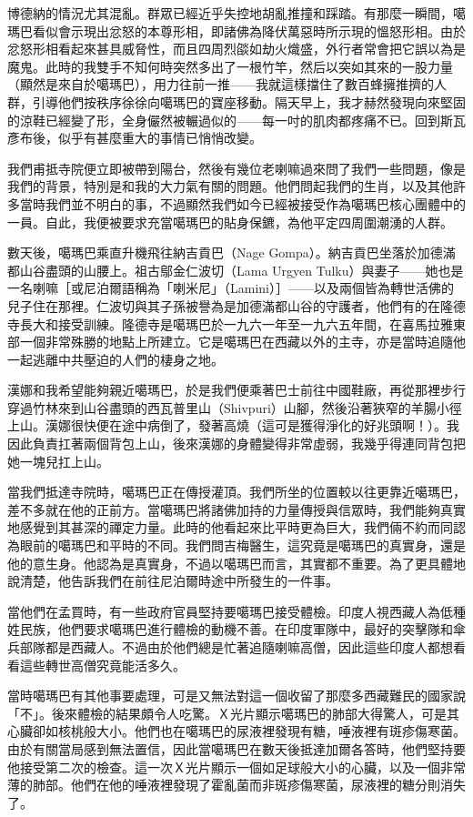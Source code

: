 博德納的情況尤其混亂。群眾已經近乎失控地胡亂推撞和踩踏。有那麼一瞬間，噶瑪巴看似會示現出忿怒的本尊形相，即諸佛為降伏萬惡時所示現的慍怒形相。由於忿怒形相看起來甚具威脅性，而且四周烈燄如劫火熾盛，外行者常會把它誤以為是魔鬼。此時的我雙手不知何時突然多出了一根竹竿，然后以突如其來的一股力量（顯然是來自於噶瑪巴），用力往前一推——我就這樣擋住了數百蜂擁推擠的人群，引導他們按秩序徐徐向噶瑪巴的寶座移動。隔天早上，我才赫然發現向來堅固的涼鞋已經變了形，全身儼然被輾過似的——每一吋的肌肉都疼痛不已。回到斯瓦彥布後，似乎有甚麼重大的事情已悄悄改變。

我們甫抵寺院便立即被帶到陽台，然後有幾位老喇嘛過來問了我們一些問題，像是我們的背景，特別是和我的大力氣有關的問題。他們問起我們的生肖，以及其他許多當時我們並不明白的事，不過顯然我們如今已經被接受作為噶瑪巴核心團體中的一員。自此，我便被要求充當噶瑪巴的貼身保鑣，為他平定四周圍潮湧的人群。　

數天後，噶瑪巴乘直升機飛往納吉貢巴（Nage
Gompa）。納吉貢巴坐落於加德滿都山谷盡頭的山腰上。祖古鄔金仁波切（Lama
Urgyen
Tulku）與妻子——她也是一名喇嘛［或尼泊爾語稱為「喇米尼」（Lamini）］——以及兩個皆為轉世活佛的兒子住在那裡。仁波切與其子孫被譽為是加德滿都山谷的守護者，他們有的在隆德寺長大和接受訓練。隆德寺是噶瑪巴於一九六一年至一九六五年間，在喜馬拉雅東部一個非常殊勝的地點上所建立。它是噶瑪巴在西藏以外的主寺，亦是當時追隨他一起逃離中共壓迫的人們的棲身之地。

漢娜和我希望能夠親近噶瑪巴，於是我們便乘著巴士前往中國鞋廠，再從那裡步行穿過竹林來到山谷盡頭的西瓦普里山（Shivpuri）山腳，然後沿著狹窄的羊腸小徑上山。漢娜很快便在途中病倒了，發著高燒（這可是獲得淨化的好兆頭啊！）。我因此負責扛著兩個背包上山，後來漢娜的身體變得非常虛弱，我幾乎得連同背包把她一塊兒扛上山。

當我們抵達寺院時，噶瑪巴正在傳授灌頂。我們所坐的位置較以往更靠近噶瑪巴，差不多就在他的正前方。當噶瑪巴將諸佛加持的力量傳授與信眾時，我們能夠真實地感覺到其甚深的禪定力量。此時的他看起來比平時更為巨大，我們倆不約而同認為眼前的噶瑪巴和平時的不同。我們問吉梅醫生，這究竟是噶瑪巴的真實身，還是他的意生身。他認為是真實身，不過以噶瑪巴而言，其實都不重要。為了更具體地說清楚，他告訴我們在前往尼泊爾時途中所發生的一件事。

當他們在孟買時，有一些政府官員堅持要噶瑪巴接受體檢。印度人視西藏人為低種姓民族，他們要求噶瑪巴進行體檢的動機不善。在印度軍隊中，最好的突擊隊和傘兵部隊都是西藏人。不過由於他們總是忙著追隨喇嘛高僧，因此這些印度人都想看看這些轉世高僧究竟能活多久。

當時噶瑪巴有其他事要處理，可是又無法對這一個收留了那麼多西藏難民的國家說「不」。後來體檢的結果頗令人吃驚。Ｘ光片顯示噶瑪巴的肺部大得驚人，可是其心臟卻如核桃般大小。他們也在噶瑪巴的尿液裡發現有糖，唾液裡有斑疹傷寒菌。由於有關當局感到無法置信，因此當噶瑪巴在數天後抵達加爾各答時，他們堅持要他接受第二次的檢查。這一次Ｘ光片顯示一個如足球般大小的心臟，以及一個非常薄的肺部。他們在他的唾液裡發現了霍亂菌而非斑疹傷寒菌，尿液裡的糖分則消失了。

